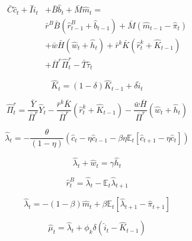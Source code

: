 \documentclass[11pt,preprint]{elsarticle}
\numberwithin{equation}{section}
\numberwithin{figure}{section}
\numberwithin{table}{section}
\begin{document}
\begingroup
\small

\begin{equation}\label{flow_constraint_real_linearised}
\begin{aligned}
\bar{C}\hat{c}_t + \bar{I}\hat{i}_t &+ \bar{B}\hat{b}_t + \bar{M}\hat{m}_t = \\
&\bar{r}^B\bar{B}(\hat{r}^B_{t-1} + \hat{b}_{t-1}) + \bar{M}(\hat{m}_{t-1} - \hat{\pi}_t) \\
&+ \bar{w}\bar{H}(\hat{w}_t + \hat{h}_t) + \bar{r}^k\bar{K}(\hat{r}^k_t + \hat{K}_{t-1}) \\
&+ \overline{\Pi}^r \widehat{\Pi}^r_t - \bar{T}\hat{\tau}_t
\end{aligned}
\end{equation}

\begin{equation}\label{capital_accumulation_real_linearised}
\hat{K}_t = (1-\delta)\hat{K}_{t-1} + \delta \hat{i}_t
\end{equation}

\begin{equation}\label{intermediate_firm_profit_real_linearised}
\widehat{\Pi}^r_t = \frac{\bar{Y}}{\overline{\Pi}^r}\hat{Y}_t - \frac{\bar{r}^k\bar{K}}{\overline{\Pi}^r}(\hat{r}^k_t + \hat{K}_{t-1}) - \frac{\bar{w}\bar{H}}{\overline{\Pi}^r}(\hat{w}_t + \hat{h}_t)
\end{equation}

\begin{equation}\label{foc_C_linearised}
\hat{\lambda}_t = -\frac{\theta}{(1-\eta)} \left( \hat{c}_t - \eta \hat{c}_{t-1} - \beta\eta \mathbb{E}_t \left[\hat{c}_{t+1} - \eta \hat{c}_t\right] \right)
\end{equation}

\begin{equation}\label{foc_h_linearised}
\hat{\lambda}_t + \hat{w}_t = \gamma \hat{h}_t
\end{equation}

\begin{equation}\label{foc_B_linearised}
\hat{r}^B_t = \hat{\lambda}_t - \mathbb{E}_t \hat{\lambda}_{t+1}
\end{equation}

\begin{equation}\label{foc_M_linearised}
\hat{\lambda}_t = -(1 - \beta) \hat{m}_t + \beta \mathbb{E}_t \left[ \hat{\lambda}_{t+1} - \hat{\pi}_{t+1} \right]
\end{equation}

\begin{equation}\label{foc_I_linearised}
\hat{\mu}_t = \hat{\lambda}_t + \phi_k \delta \left( \hat{i}_t - \hat{K}_{t-1} \right)
\end{equation}
\end{document}
